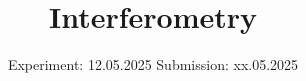 

\subject{V64}
\title{Interferometry}
\date{%
  Experiment: 12.05.2025
  \hspace{3em}
  Submission: xx.05.2025
}



\maketitle
\thispagestyle{empty}
\tableofcontents
\newpage






\printbibliography{}
\appendix
\setcounter{secnumdepth}{0}

